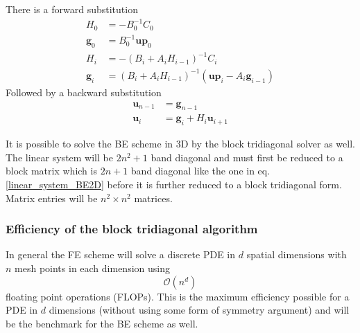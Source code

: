 \noindent There is a forward substitution
\begin{align}\label{block_tridiag_alg}
 H_0 &= -B_0^{-1}C_0\nonumber \\
 \mathbf{g}_0 &= B_0^{-1}\mathbf{up}_0 \nonumber\\
 H_i &= -\left(B_i+A_iH_{i-1}\right)^{-1}C_i \nonumber \\
 \mathbf{g}_i &= \left(B_i+A_iH_{i-1}\right)^{-1}\left(\mathbf{up}_i-A_i\mathbf{g}_{i-1}\right)
 \end{align}
 Followed by a backward substitution
 \begin{align*}
  \mathbf{u}_{n-1} &= \mathbf{g}_{n-1}\nonumber\\
  \mathbf{u}_i &= \mathbf{g}_i + H_i\mathbf{u}_{i+1} \nonumber
 \end{align*}
 
 \noindent It is possible to solve the BE scheme in 3D by the block tridiagonal solver as well. 
 The linear system will be $2n^2 +1$ band diagonal and must first be reduced to a block matrix which is $2n+1$ band diagonal like the one in eq. \eqref{linear_system_BE2D} before it is further reduced to a block tridiagonal form. 
 Matrix entries will be $n^2\times n^2$ matrices.
 
 \subsubsection{Efficiency of the block tridiagonal algorithm}
 
 In general the FE scheme will solve a discrete PDE in $d$ spatial dimensions with $n$ mesh points in each dimension using
 \begin{equation*}
  \mathcal O(n^d)
 \end{equation*}
floating point operations (FLOPs). 
This is the maximum efficiency possible for a PDE in $d$ dimensions (without using some form of symmetry argument) and will be the benchmark for the BE scheme as well.\\

